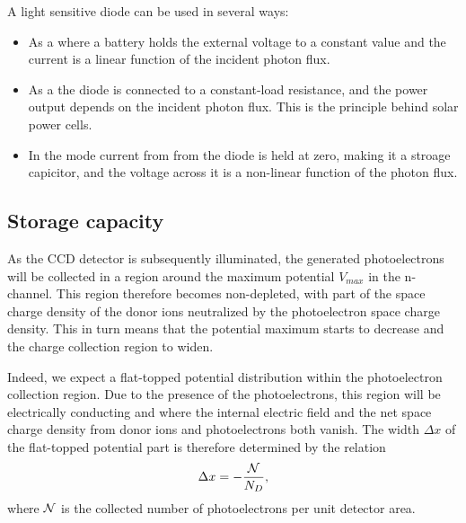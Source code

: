 A light sensitive diode can be used in several ways:
\begin{itemize}
	\item As a {} where a battery holds the external voltage
  to a constant value and the current is a linear function of the
  incident photon flux.
\item As a {} the diode is connected to a constant-load
  resistance, and the power output depends on the incident photon
  flux. This is the principle behind solar power cells.
\item In the {} mode current from from the diode
  is held at zero, making it a stroage capicitor, and the voltage
  across it is a non-linear function of the photon flux.
\end{itemize}

\subsection{Storage capacity}

As the CCD detector is subsequently illuminated, the generated
photoelectrons will be collected in a region around the maximum
potential $V_{max}$ in the n-channel. This region therefore becomes
non-depleted, with part of the space charge density of the donor ions
neutralized by the photoelectron space charge density. This in turn
means that the potential maximum starts to decrease and the charge
collection region to widen. 

Indeed, we expect a flat-topped potential distribution within the
photoelectron collection region. Due to the presence of the
photoelectrons, this region will be electrically conducting and where
the internal electric field and the net space charge density
from donor ions and photoelectrons both vanish. The width $\Delta x$
of the flat-topped potential part is therefore determined by the
relation
\begin{equation}
  \Delta x = -\frac{{\cal N}}{N_D},
\end{equation}
where ${\cal N}$ is the collected number of photoelectrons per unit
detector area.

